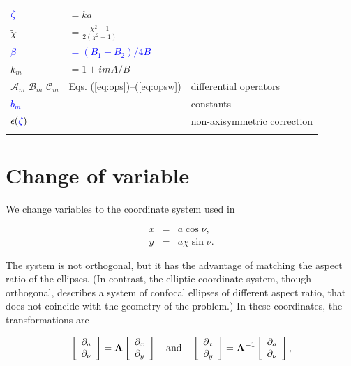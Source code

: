 \documentclass[apj]{emulateapj}
\newcommand{\vt}[1]{\mathbf{#1}}       %
\def\blue#1{\textcolor{blue}{ #1}}
\newcommand{\Eqss}[2]{Eqs. (\ref{#1})--(\ref{#2})}
\newcommand{\eqss}[2]{\Eqss{#1}{#2}}
\newcommand{\beq}{\begin{equation}}
\newcommand{\eeq}{\end{equation}}
\newcommand{\beqn}{\begin{eqnarray}}
\newcommand{\eeqn}{\end{eqnarray}}
\newcommand{\tilchi}{\tilde\chi}
\begin{document}
\begin{table}
\begin{center}
\begin{tabular}{l l l}
$\blue{\zeta}$ & $=ka$ & \\
$\tilchi$ & $=\frac{\chi^2-1}{2(\chi^2+1)}$ & \\
\blue{$\beta$} & \blue{$=(B_1-B_2)/4B$}& \\
$k_m$ & $= 1+imA/B$ & \\
$\mathcal{A}_m$ $\mathcal{B}_m$ $\mathcal{C}_m$  &\eqss{eq:ops}{eq:opsw} & differential operators \\
\blue{$b_m$} & & constants\\
$\epsilon(\blue{\zeta})$ & & non-axisymmetric correction \\
 & & \\ \hline
\end{tabular}
\end{center}
\end{table}


\section{Change of variable}
\label{sect:coordinate-transformation}

We change variables to the coordinate system used in \citet{Chang-Oishi10}

\beqn
  x &=& a \cos\nu, \label{eq:change-x}\\
  y &=& a\chi\sin\nu.  \label{eq:change-y}
\eeqn

The system is not orthogonal, but it has the advantage of matching the
aspect ratio of the ellipses. (In contrast, the elliptic coordinate
system, though orthogonal, describes a system of confocal ellipses of
different aspect ratio, that does not coincide with the geometry of
the problem.) In these coordinates, the transformations are 

\beq
\left[\begin{array}{c}
    \partial_{a}  \\
    \partial_{\nu}
  \end{array}\right] = \vt{A} 
  \left[\begin{array}{c}
      \partial_{x}  \\
      \partial_{y}
    \end{array}\right] 
%
\quad {\rm and} \quad 
%
\left[\begin{array}{c}
    \partial_{x}  \\
    \partial_{y}
  \end{array}\right] = \vt{A}^{-1} 
  \left[\begin{array}{c}
      \partial_{a}  \\
      \partial_{\nu}
    \end{array}\right],  
%
\eeq
\end{document}
